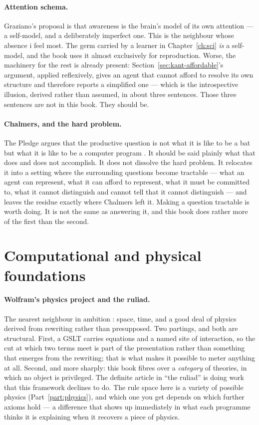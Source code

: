 \paragraph{Attention schema.}
Graziano's proposal \cite{graziano2013} is that awareness is the
brain's model of its own attention --- a self-model, and a
deliberately imperfect one.
This is the neighbour whose absence i feel most.
The germ carried by a learner in Chapter~\ref{ch:sci} \emph{is} a
self-model, and the book uses it almost exclusively for
reproduction.
Worse, the machinery for the rest is already present:
Section~\ref{sec:kant-affordable}'s argument, applied reflexively,
gives an agent that cannot afford to resolve its own structure and
therefore reports a simplified one --- which is the introspective
illusion, derived rather than assumed, in about three sentences.
Those three sentences are not in this book.
They should be.

\paragraph{Chalmers, and the hard problem.}
The Pledge argues that the productive question is not what it is
like to be a bat but what it is like to be a computer program
\cite{nagel1974,chalmers1996}.
It should be said plainly what that does and does not accomplish.
It does not dissolve the hard problem.
It relocates it into a setting where the surrounding questions
become tractable --- what an agent can represent, what it can
afford to represent, what it must be committed to, what it cannot
distinguish and cannot tell that it cannot distinguish --- and
leaves the residue exactly where Chalmers left it.
Making a question tractable is worth doing.
It is not the same as answering it, and this book does rather more
of the first than the second.

\section*{Computational and physical foundations}

\paragraph{Wolfram's physics project and the ruliad.}
The nearest neighbour in ambition \cite{wolfram2020,wolfram2021}:
space, time, and a good deal of physics derived from rewriting
rather than presupposed.
Two partings, and both are structural.
First, a GSLT carries equations and a named site of interaction, so
the cut at which two terms meet is part of the presentation rather
than something that emerges from the rewriting; that is what makes
it possible to meter anything at all.
Second, and more sharply: this book fibres over a \emph{category}
of theories, in which no object is privileged.
The definite article in ``the ruliad'' is doing work that this
framework declines to do.
The rule space here is a variety of possible physics
(Part~\ref{part:physics}), and which one you get depends on which
further axioms hold --- a difference that shows up immediately in
what each programme thinks it is explaining when it recovers a
piece of physics.

